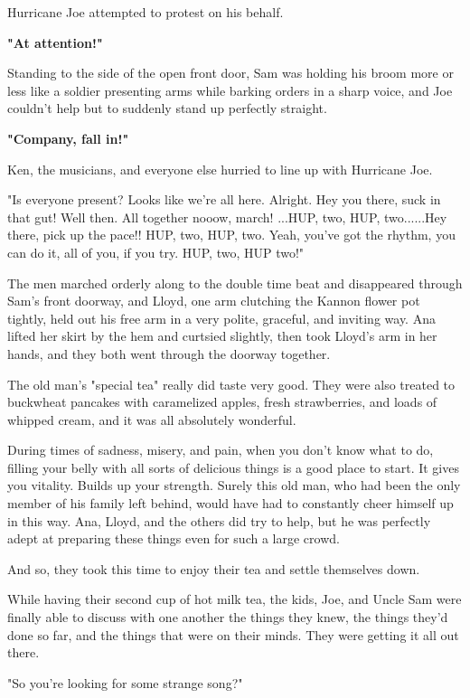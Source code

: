 \documentclass[
]{article}
\begin{document}
Hurricane Joe attempted to protest on his behalf.

\textbf{"At attention!"}

Standing to the side of the open front door, Sam was holding his broom
more or less like a soldier presenting arms while barking orders in a
sharp voice, and Joe couldn't help but to suddenly stand up perfectly
straight.

\textbf{"Company, fall in!"}

Ken, the musicians, and everyone else hurried to line up with Hurricane
Joe.

"Is everyone present? Looks like we're all here. Alright. Hey you there,
suck in that gut! Well then. All together nooow, march! ...HUP, two,
HUP, two......Hey there, pick up the pace!! HUP, two, HUP, two. Yeah,
you've got the rhythm, you can do it, all of you, if you try. HUP, two,
HUP two!"

The men marched orderly along to the double time beat and disappeared
through Sam's front doorway, and Lloyd, one arm clutching the Kannon
flower pot tightly, held out his free arm in a very polite, graceful,
and inviting way. Ana lifted her skirt by the hem and curtsied slightly,
then took Lloyd's arm in her hands, and they both went through the
doorway together.

The old man's "special tea" really did taste very good. They were also
treated to buckwheat pancakes with caramelized apples, fresh
strawberries, and loads of whipped cream, and it was all absolutely
wonderful.

During times of sadness, misery, and pain, when you don't know what to
do, filling your belly with all sorts of delicious things is a good
place to start. It gives you vitality. Builds up your strength. Surely
this old man, who had been the only member of his family left behind,
would have had to constantly cheer himself up in this way. Ana, Lloyd,
and the others did try to help, but he was perfectly adept at preparing
these things even for such a large crowd.

And so, they took this time to enjoy their tea and settle themselves
down.

While having their second cup of hot milk tea, the kids, Joe, and Uncle
Sam were finally able to discuss with one another the things they knew,
the things they'd done so far, and the things that were on their minds.
They were getting it all out there.

"So you're looking for some strange song?"
\end{document}
